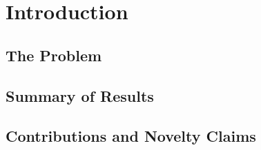 \documentclass[11pt]{article}
\begin{document}
\section{Introduction}
\label{sec:intro}


\subsection{The Problem}
%

\subsection{Summary of Results}
%

\subsection{Contributions and Novelty Claims}
\end{document}
